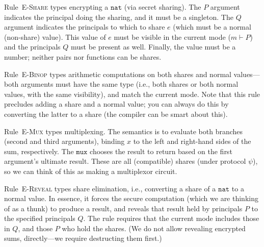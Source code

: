\documentclass[10pt]{article}
\newcommand{\rulelab}[1]{{\small \textsc{#1}}}
\newcommand{\kw}[1]{\ensuremath{\mathtt{#1}}}
\newcommand{\tnat}{\ensuremath{\mathtt{nat}}}
\begin{document}
Rule~\rulelab{E-Share} types encrypting a $\tnat$ (via secret
sharing). The $P$ argument indicates the principal doing the sharing,
and it must be a singleton. The $Q$ argument indicates the principals
to which to share $e$ (which must be a normal (non-share) value). This
value of $e$ must be visible in the current mode ($m \vdash P$) and
the principals $Q$ must be present as well. Finally, the value must be
a number; neither pairs nor functions can be shares.


Rule~\rulelab{E-Binop} types arithmetic computations on both shares
and normal values---both arguments must have the same type (i.e., both
shares or both normal values, with the same visibility), and match the
current mode. Note that this rule precludes adding a 
share and a normal value; you can always do this by converting the
latter to a share (the compiler can be smart about this).


Rule~\rulelab{E-Mux} types multiplexing. The semantics is to evaluate
both branches (second and third arguments), binding $x$ to the left
and right-hand sides of the sum, respectively. The $\kw{mux}$ chooses
the result to return based on the first argument's ultimate
result. These are all (compatible) shares (under protocol $\psi$), so
we can think of this as making a multiplexor circuit.

Rule~\rulelab{E-Reveal} types share elimination, i.e., converting a
share of a $\tnat$ to a normal value. In essence, it forces the secure
computation (which we are thinking of as a thunk) to produce a result,
and reveals that result held by principals $P$ to the specified
principals $Q$. The rule requires that the current mode includes those
in $Q$, and those $P$ who hold the shares. (We do not allow revealing
encrypted sums, directly---we require destructing them first.)
\end{document}
